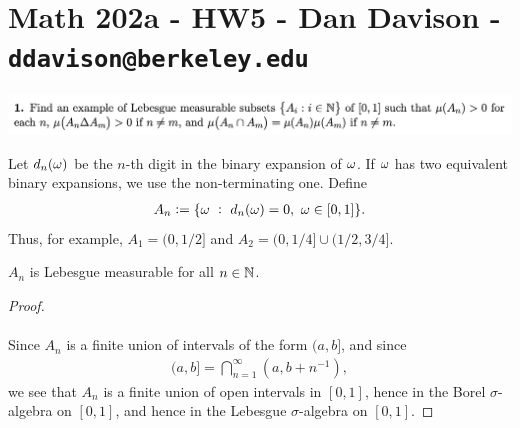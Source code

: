 \section{Math 202a - HW5 - Dan Davison - \texttt{ddavison@berkeley.edu}}



\begin{mdframed}
\includegraphics[width=400pt]{img/analysis--berkeley-202a-hw05-781b.png}
\end{mdframed}


\begin{definition*}
  Let $d_n(\omega)$ be the $n$-th digit in the binary expansion of $\omega$. If $\omega$ has two equivalent binary
  expansions, we use the non-terminating one. Define
  \begin{align*}
    A_n := \{\omega ~:~ d_n(\omega) = 0, ~ \omega \in [0, 1]\}.
  \end{align*}
  Thus, for example, $A_1 = (0, 1/2]$ and $A_2 = (0, 1/4] \cup (1/2, 3/4]$.
\end{definition*}

\begin{claim*}
  $A_n$ is Lebesgue measurable for all $n \in \mathbb{N}$.
\end{claim*}

\begin{proof}~\\~\\
  Since $A_n$ is a finite union of intervals of the form $(a, b]$, and since
  \begin{align*}
    (a, b] = \bigcap_{n=1}^\infty (a, b + n^{-1}),
  \end{align*}
  we see that $A_n$ is a finite union of open intervals in $[0, 1]$, hence in the Borel $\sigma$-algebra
  on $[0, 1]$, and hence in the Lebesgue $\sigma$-algebra on $[0, 1]$.
\end{proof}


